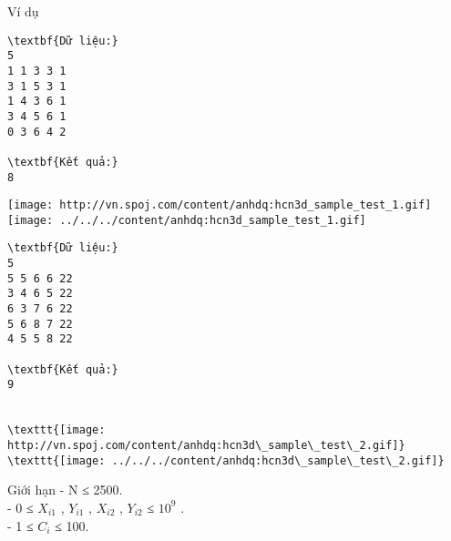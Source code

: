 Ví dụ
\begin{verbatim}
\textbf{Dữ liệu:}
5
1 1 3 3 1
3 1 5 3 1
1 4 3 6 1
3 4 5 6 1
0 3 6 4 2

\textbf{Kết quả:}
8
\end{verbatim}


\texttt{[image: http://vn.spoj.com/content/anhdq:hcn3d\_sample\_test\_1.gif]}
\texttt{[image: ../../../content/anhdq:hcn3d\_sample\_test\_1.gif]}
\begin{verbatim}
\textbf{Dữ liệu:}
5
5 5 6 6 22
3 4 6 5 22
6 3 7 6 22
5 6 8 7 22
4 5 5 8 22

\textbf{Kết quả:}
9


\texttt{[image: http://vn.spoj.com/content/anhdq:hcn3d\_sample\_test\_2.gif]}
\texttt{[image: ../../../content/anhdq:hcn3d\_sample\_test\_2.gif]}\end{verbatim}
Giới hạn
- N ≤ 2500.
\\- 0 ≤ $X_{i1}$ , $Y_{i1}$ , $X_{i2}$ , $Y_{i2}$ ≤ $10^{9}$ .
\\- 1 ≤ $C_{i}$ ≤ 100.

 